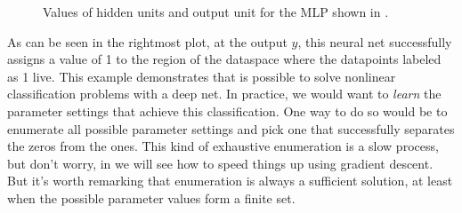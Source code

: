 \begin{figure}[h]
\begin{minipage}{1.0\linewidth}
\end{minipage}
\caption{Values of hidden units and output unit for the MLP shown in \fig{\ref{fig:neural_nets:simple_MLP_network}}.}
\label{fig:neural_nets:simple_MLP_network_values}
\end{figure}

As can be seen in the rightmost plot, at the output $y$, this neural net successfully assigns a value of 1 to the region of the dataspace where the datapoints labeled as 1 live. This example demonstrates that is possible to solve nonlinear classification problems with a deep net. In practice, we would want to \textit{learn} the parameter settings that achieve this classification. One way to do so would be to enumerate all possible parameter settings and pick one that successfully separates the zeros from the ones. This kind of exhaustive enumeration is a slow process, but don't worry, in \chap{\ref{chapter:backpropagation}} we will see how to speed things up using gradient descent. But it's worth remarking that enumeration is always a sufficient solution, at least when the possible parameter values form a finite set.






